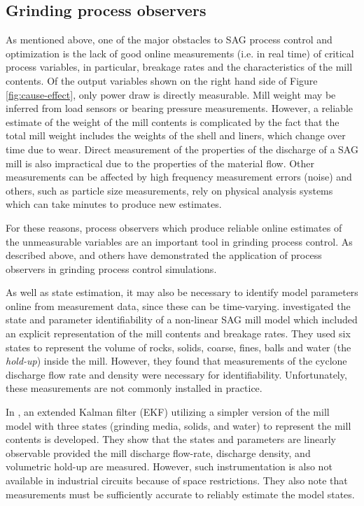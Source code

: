 \subsection{Grinding process observers}

As mentioned above, one of the major obstacles to SAG process control and optimization is the lack of good online measurements (i.e. in real time) of critical process variables, in particular, breakage rates and the characteristics of the mill contents. Of the output variables shown on the right hand side of Figure \ref{fig:cause-effect}, only power draw is directly measurable. Mill weight may be inferred from load sensors or bearing pressure measurements. However, a reliable estimate of the weight of the mill contents is complicated by the fact that the total mill weight includes the weights of the shell and liners, which change over time due to wear. Direct measurement of the properties of the discharge of a SAG mill is also impractical due to the properties of the material flow.  Other measurements can be affected by high frequency measurement errors (noise) and others, such as particle size measurements, rely on physical analysis systems which can take minutes to produce new estimates.

For these reasons, process observers which produce reliable online estimates of the unmeasurable variables are an important tool in grinding process control.  As described above, \cite{le_roux_throughput_2016} and others have demonstrated the application of process observers in grinding process control simulations.  

As well as state estimation, it may also be necessary to identify model parameters online from measurement data, since these can be time-varying. \cite{le_roux_state_2016} investigated the state and parameter identifiability of a non-linear SAG mill model which included an explicit representation of the mill contents and breakage rates. They used six states to represent the volume of rocks, solids, coarse, fines, balls and water (the \textit{hold-up}) inside the mill. However, they found that measurements of the cyclone discharge flow rate and density were necessary for identifiability. Unfortunately, these measurements are not commonly installed in practice.

In \cite{le_roux_ekf_2017}, an extended Kalman filter (EKF) utilizing a simpler version of the mill model with three states (grinding media, solids, and water) to represent the mill contents is developed. They show that the states and parameters are linearly observable provided the mill discharge flow-rate, discharge density, and volumetric hold-up are measured. However, such instrumentation is also not available in industrial circuits because of space restrictions. They also note that measurements must be sufficiently accurate to reliably estimate the model states.

